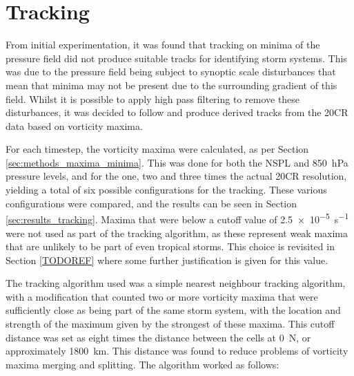 \documentclass[pdftex,12pt,a4paper]{report}
\begin{document}
\section{Tracking}

From initial experimentation, it was found that tracking on minima of the pressure field did not
produce suitable tracks for identifying storm systems. This was due to the pressure field being
subject to synoptic scale disturbances that mean that minima may not be present due to the
surrounding gradient of this field. Whilst it is possible to apply high pass filtering to remove
these disturbances, it was decided to follow \textcite{reed1988evaluation, thorncroft2001african}
and produce derived tracks from the 20CR data based on vorticity maxima.

For each timestep, the vorticity maxima were calculated, as per Section
\ref{sec:methods_maxima_minima}. This was done for both the NSPL and \SI{850}{hPa} pressure
levels, and for the one, two and three times the actual 20CR resolution, yielding a total of six
possible configurations for the tracking. These various configurations were compared, and the
results can be seen in Section \ref{sec:results_tracking}. Maxima that were below a cutoff value
of \SI{2.5e-5}{s^{-1}} were not used as part of the tracking algorithm, as these represent weak maxima
that are unlikely to be part of even tropical storms. This choice is revisited in Section
\ref{TODOREF} where some further justification is given for this value.

The tracking algorithm used was a simple nearest neighbour tracking algorithm, with a modification
that counted two or more vorticity maxima that were sufficiently close as being part of the same storm
system, with the location and strength of the maximum given by the strongest of
these maxima. This cutoff distance was set as eight times the distance between the cells at
0\textdegree\ N, or approximately \SI{1800}{km}. This distance was found to reduce problems of
vorticity maxima merging and splitting. The algorithm worked as follows:
\end{document}
